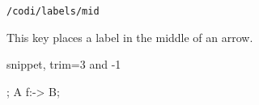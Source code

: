 \begin{lstlisting}
/codi/labels/mid
\end{lstlisting}

This key places a label in the middle of an arrow.

\begin{tcblisting}{snippet, trim={3 and -1}}
\begin{codi}
;
\mor [mid] A f:-> B;
\end{codi}
\end{tcblisting}
